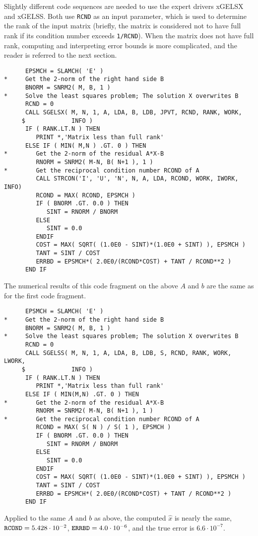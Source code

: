 {Slightly different code sequences are needed to use the expert
drivers xGELSX and xGELSS. Both use {\tt RCND} as an input parameter,
which is used to determine the rank of the input matrix (briefly,
the matrix is considered not to have full rank if its condition
number exceeds {\tt 1/RCND}).
When the matrix does not have full rank,
computing and interpreting error bounds is more complicated, and
the reader is referred to the next section.

\begin{verbatim}
      EPSMCH = SLAMCH( 'E' )
*     Get the 2-norm of the right hand side B
      BNORM = SNRM2( M, B, 1 )
*     Solve the least squares problem; The solution X overwrites B
      RCND = 0
      CALL SGELSX( M, N, 1, A, LDA, B, LDB, JPVT, RCND, RANK, WORK,
     $             INFO )
      IF ( RANK.LT.N ) THEN
         PRINT *,'Matrix less than full rank'
      ELSE IF ( MIN( M,N ) .GT. 0 ) THEN
*        Get the 2-norm of the residual A*X-B
         RNORM = SNRM2( M-N, B( N+1 ), 1 )
*        Get the reciprocal condition number RCOND of A
         CALL STRCON('I', 'U', 'N', N, A, LDA, RCOND, WORK, IWORK, INFO)
         RCOND = MAX( RCOND, EPSMCH )
         IF ( BNORM .GT. 0.0 ) THEN
            SINT = RNORM / BNORM
         ELSE
            SINT = 0.0
         ENDIF
         COST = MAX( SQRT( (1.0E0 - SINT)*(1.0E0 + SINT) ), EPSMCH )
         TANT = SINT / COST
         ERRBD = EPSMCH*( 2.0E0/(RCOND*COST) + TANT / RCOND**2 )
      END IF
\end{verbatim}
The numerical results of this code fragment on the above $A$ and $b$ are
the same as for the first code fragment.

\begin{verbatim}
      EPSMCH = SLAMCH( 'E' )
*     Get the 2-norm of the right hand side B
      BNORM = SNRM2( M, B, 1 )
*     Solve the least squares problem; The solution X overwrites B
      RCND = 0
      CALL SGELSS( M, N, 1, A, LDA, B, LDB, S, RCND, RANK, WORK, LWORK,
     $             INFO )
      IF ( RANK.LT.N ) THEN
         PRINT *,'Matrix less than full rank'
      ELSE IF ( MIN(M,N) .GT. 0 ) THEN
*        Get the 2-norm of the residual A*X-B
         RNORM = SNRM2( M-N, B( N+1 ), 1 )
*        Get the reciprocal condition number RCOND of A
         RCOND = MAX( S( N ) / S( 1 ), EPSMCH )
         IF ( BNORM .GT. 0.0 ) THEN
            SINT = RNORM / BNORM
         ELSE
            SINT = 0.0
         ENDIF
         COST = MAX( SQRT( (1.0E0 - SINT)*(1.0E0 + SINT) ), EPSMCH )
         TANT = SINT / COST
         ERRBD = EPSMCH*( 2.0E0/(RCOND*COST) + TANT / RCOND**2 )
      END IF
\end{verbatim}

Applied to the same $A$ and $b$ as above, the computed $\hat{x}$ is
nearly the same,
${\tt RCOND} = 5.428 \cdot 10^{-2}$,
${\tt ERRBD} = 4.0 \cdot 10^{-6}$, and the true error is
$6.6 \cdot 10^{-7}$.
}


